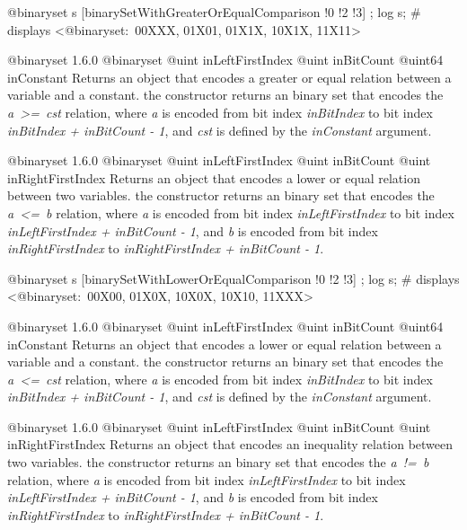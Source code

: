 \exempleDeuxLignes
{}
{@binaryset s [binarySetWithGreaterOrEqualComparison !0 !2 !3] ;}
{log s; \# displays <@binaryset:~00XXX, 01X01, 01X1X, 10X1X, 11X11>}





{@binaryset}
{1.6.0}
{@binaryset}
{@uint inLeftFirstIndex}
{@uint inBitCount}
{@uint64 inConstant}
{Returns an  object that encodes a greater or equal relation between a variable and a constant.}
{the constructor returns an binary set that encodes the \emph{a~>=~cst} relation, where \emph {a} is encoded from bit index \emph{inBitIndex} to bit index \emph{inBitIndex  + inBitCount - 1}, and \emph{cst} is defined by the \emph{inConstant} argument.}





{@binaryset}
{1.6.0}
{@binaryset}
{@uint inLeftFirstIndex}
{@uint inBitCount}
{@uint inRightFirstIndex}
{Returns an  object that encodes a lower or equal relation between two variables.}
{the constructor returns an binary set that encodes the \emph{a~<=~b} relation, where \emph{a} is encoded from bit index \emph{inLeftFirstIndex} to bit index \emph{inLeftFirstIndex  + inBitCount - 1}, and \emph{b} is encoded from bit index \emph{inRightFirstIndex} to \emph{inRightFirstIndex + inBitCount - 1}.}

\exempleDeuxLignes
{}
{@binaryset s [binarySetWithLowerOrEqualComparison !0 !2 !3] ;}
{log s; \# displays <@binaryset:~00X00, 01X0X, 10X0X, 10X10, 11XXX>}





{@binaryset}
{1.6.0}
{@binaryset}
{@uint inLeftFirstIndex}
{@uint inBitCount}
{@uint64 inConstant}
{Returns an  object that encodes a lower or equal relation between a variable and a constant.}
{the constructor returns an binary set that encodes the \emph{a~<=~cst} relation, where \emph {a} is encoded from bit index \emph{inBitIndex} to bit index \emph{inBitIndex  + inBitCount - 1}, and \emph{cst} is defined by the \emph{inConstant} argument.}





{@binaryset}
{1.6.0}
{@binaryset}
{@uint inLeftFirstIndex}
{@uint inBitCount}
{@uint inRightFirstIndex}
{Returns an  object that encodes an inequality relation between two variables.}
{the constructor returns an binary set that encodes the \emph{a~!=~b} relation, where \emph{a} is encoded from bit index \emph{inLeftFirstIndex} to bit index \emph{inLeftFirstIndex  + inBitCount - 1}, and \emph{b} is encoded from bit index \emph{inRightFirstIndex} to \emph{inRightFirstIndex + inBitCount - 1}.}

